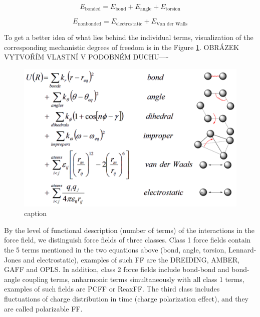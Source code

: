 \begin{equation}\label{eq:ff2}
	E_{\text{bonded}} = E_{\text{bond}} + E_{\text{angle}} + E_{\text{torsion}}
\end{equation}

\begin{equation}\label{eq:ff3}
	E_{\text{nonbonded}} = E_{\text{electrostatic}} + E_{\text{Van der Walls}}
\end{equation}

To get a better idea of what lies behind the individual terms, visualization of the corresponding mechanistic degrees of freedom is in the Figure \ref{fig:ff}. OBRÁZEK VYTVOŘÍM VLASTNÍ V PODOBNÉM DUCHU----

\begin{figure}[htb!]
	\centering
	\includegraphics[width=1.0\linewidth]{img/ff.png} 
	\caption{caption}
	\label{fig:ff}    
\end{figure}  

\newpage
By the level of functional description (number of terms) of the interactions in the force field, we distinguish force fields of three classes. Class 1 force fields contain the 5 terms mentioned in the two equations above (bond, angle, torsion, Lennard-Jones and electrostatic), examples of such FF are the DREIDING, AMBER, GAFF and OPLS. In addition, class 2 force fields include bond-bond and bond-angle coupling terms, anharmonic terms simultaneously with all class 1 terms, examples of such fields are PCFF or ReaxFF.  The third class includes fluctuations of charge distribution in time (charge polarization effect), and they are called polarizable FF. \cite{vanommeslaeghe_molecular_2014}

